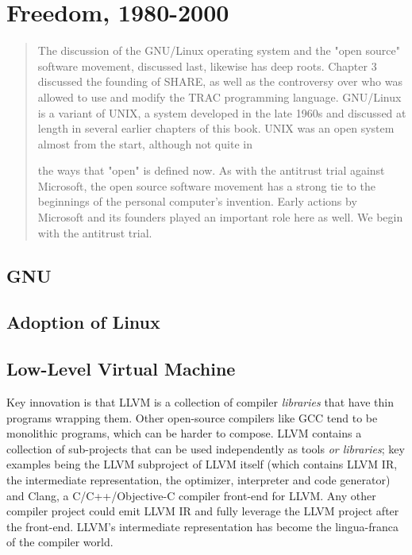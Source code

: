 \chapter{Freedom, 1980-2000}
\begin{quotation}
The discussion of the GNU/Linux operating system and the "open source" software 
movement, discussed last, likewise has deep roots. Chapter 3 discussed the 
founding of SHARE, as well as the controversy over who was allowed to use and 
modify the TRAC programming language. GNU/Linux is a variant of UNIX, a system 
developed in the late 1960s and discussed at length in several earlier chapters 
of this book. UNIX was an open system almost from the start, although not quite 
in

the ways that "open" is defined now. As with the antitrust trial against 
Microsoft, the open source software movement has a strong tie to the beginnings 
of the personal computer's invention. Early actions by Microsoft and its 
founders played an important role here as well. We begin with the antitrust 
trial.
\cite{history_of_modern_computing_2003_ceruzzi}
\end{quotation}

\section{GNU}

\section{Adoption of Linux}

\section{Low-Level Virtual Machine}

Key innovation is that LLVM is a collection of compiler \textit{libraries} that have
thin programs wrapping them.
Other open-source compilers like GCC tend to be monolithic programs, which can
be harder to compose.
LLVM contains a collection of sub-projects that can be used independently as tools
\textit{or libraries}; key examples being the LLVM subproject of LLVM itself
(which contains LLVM IR, the intermediate representation, the optimizer, interpreter and code generator)
and Clang, a C/C++/Objective-C compiler front-end for LLVM.
Any other compiler project could emit LLVM IR and fully leverage the LLVM project after the front-end.
LLVM's intermediate representation has become the lingua-franca of the compiler world.

